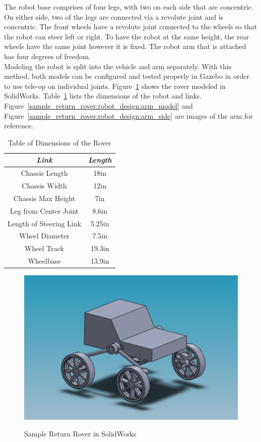 \noindent
The robot base comprises of four legs, with two on each side that are concentric. On either side, two of the legs are connected via a revolute joint and is concentric. The front wheels have a revolute joint connected to the wheels so that the robot can steer left or right. To have the robot at the same height, the rear wheels have the same joint however it is fixed. The robot arm that is attached has four degrees of freedom.\\

Modeling the robot is split into the vehicle and arm separately. With this method, both models can be configured and tested properly in Gazebo in order to use tele-op on individual joints. Figure~\ref{sample_return_rover:robot_design:srr_cad} shows the rover modeled in SolidWorks. Table~\ref{table:1} lists the dimensions of the robot and links. Figure~\ref{sample_return_rover:robot_design:arm_model} and Figure~\ref{sample_return_rover:robot_design:arm_side} are images of the arm for reference.

\begin{table}[h]
\begin{center}
	\begin{tabular}{|c|c|} 
		\hline 
		\textit{Link} & \textit{Length} \\
		\hline
		Chassis Length & 18in \\
		Chassis Width & 12in \\
		Chassis Max Height & 7in \\
		Leg from Center Joint & 8.6in \\
		Length of Steering Link & 5.25in \\ 
		Wheel Diameter & 7.5in \\
		Wheel Track & 19.3in \\
		Wheelbase & 13.9in \\
		\hline
	\end{tabular}
	\caption{\label{table:1}Table of Dimensions of the Rover}
\end{center}
\end{table}

\begin{figure}[h]
	\centering
	\includegraphics[scale=0.45]{sections/robot-design/images/SRR_model.png}
	\label{sample_return_rover:robot_design:srr_cad}
	\caption{Sample Return Rover in SolidWorks}
\end{figure}

